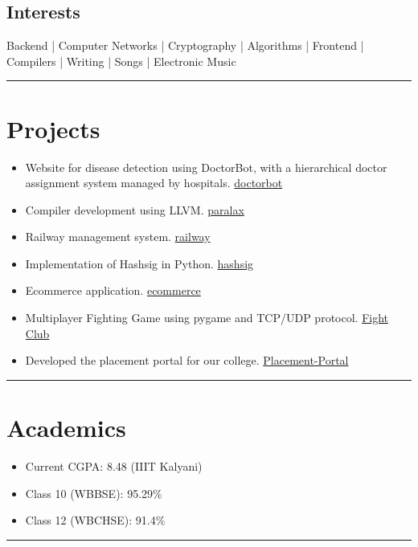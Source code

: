 \documentclass[a4paper,10pt]{article}
\begin{document}
\begin{multicols}{2}
\section*{Interests}
Backend | Computer Networks | Cryptography | Algorithms | Frontend | Compilers | Writing | Songs | Electronic Music

\end{multicols}

\noindent\rule{\linewidth}{0.4pt}  %

\section*{Projects}
\begin{itemize}
    \item Website for disease detection using DoctorBot, with a hierarchical doctor assignment system managed by hospitals. \href{https://github.com/sourish0/DoctorBot-10}{doctorbot}
    \item Compiler development using LLVM. \href{https://github.com/single-instruction/parallax}{paralax}
    \item Railway management system. \href{https://github.com/sourish0/Railway}{railway}
    \item Implementation of Hashsig in Python. \href{https://github.com/sourish0/academic}{hashsig}
    \item Ecommerce application. \href{https://github.com/sourish0/1st_ecommerce}{ecommerce}
    \item Multiplayer Fighting Game using pygame and TCP/UDP protocol. \href{https://github.com/sourish0/cn_project_lab}{Fight Club}
    \item Developed the placement portal for our college. \href{https://github.com/sourish0/Placement-Portal}{Placement-Portal}
\end{itemize}
\noindent\rule{\linewidth}{0.2pt}  %
\section*{Academics}
\begin{itemize}
    \item Current CGPA: 8.48 (IIIT Kalyani)
    \item Class 10 (WBBSE): 95.29\%
    \item Class 12 (WBCHSE): 91.4\%
\end{itemize}
\noindent\rule{\linewidth}{0.2pt}  %
\end{document}
